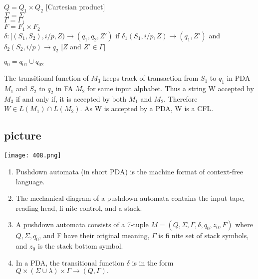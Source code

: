 \documentclass[9pt]{beamer}
\begin{document}
\begin{frame}
\hspace*{2.2cm} $Q = Q_1 \times Q_2$ [Cartesian product]\\
\hspace*{2.2cm} $\Sigma = \Sigma$ \\
\hspace*{2.2cm} $\Gamma = \Gamma_1$ \\
\hspace*{2.2cm} $F = F_1 \times F_2$ \\

\vspace*{0.2cm}
$\delta: [(S_1, S_2), i/p, Z) \rightarrow (q_1, q_2, Z')$ if $\delta_1(S_1,i/p, Z) \rightarrow (q_1, Z')$ and $\delta_2(S_2,i/p) \rightarrow q_2$
\hspace*{0.5cm} $[Z$ and $Z' \in \Gamma]$ \\

 \begin{center}
   $q_0 = q_01 \cup q_02$ \\
 \end{center}

\vspace*{0.2cm}
\hspace*{0.5cm} The transitional function of $M_3$ keeps track of transaction from $S_1$ to $q_1$ in PDA $M_1$ and $S_2$ to $q_2$ in FA
$M_2$ for same input alphabet. Thus a string W accepted by $M_3$ if and only if, it is accepted by both $M_1$ and
$M_2$. Therefore $W \in L(M_1) \cap L(M_2)$. As W is accepted by a PDA, W is a CFL.\\
\end{frame}

\begin{frame}
\begin{center}
\section{picture}
\texttt{[image: 408.png]}
\end{center}

\begin{enumerate}
  \item Pushdown automata (in short PDA) is the machine format of context-free language.\\
  \item The mechanical diagram of a pushdown automata contains the input tape, reading head, fi nite
control, and a stack.\\
  \item A pushdown automata consists of a 7-tuple $M = (Q, \Sigma, \Gamma, \delta, q_0, z_0, F)$ where $Q, \Sigma, q_0$, and F have
their original meaning, $\Gamma$ is fi nite set of stack symbols, and $z_0$ is the stack bottom symbol.\\
  \item In a PDA, the transitional function $\delta$ is in the form $Q \times (\Sigma \cup {\lambda}) \times \Gamma \rightarrow (Q, \Gamma).$ \\
\end{enumerate}
\end{frame}
\end{document}
